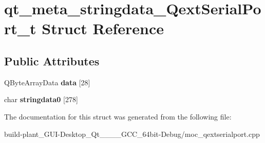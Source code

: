 \hypertarget{structqt__meta__stringdata__QextSerialPort__t}{}\section{qt\+\_\+meta\+\_\+stringdata\+\_\+\+Qext\+Serial\+Port\+\_\+t Struct Reference}
\label{structqt__meta__stringdata__QextSerialPort__t}
\subsection*{Public Attributes}
\begin{DoxyCompactItemize}
\item 
\mbox{\label{structqt__meta__stringdata__QextSerialPort__t_ad7c0c9f992a959feb84efc538943812f}} 
Q\+Byte\+Array\+Data {\bfseries data} \mbox{[}28\mbox{]}
\item 
\mbox{\label{structqt__meta__stringdata__QextSerialPort__t_a29544834fa5c30fb08d3a3eb981dc090}} 
char {\bfseries stringdata0} \mbox{[}278\mbox{]}
\end{DoxyCompactItemize}


The documentation for this struct was generated from the following file\+:\begin{DoxyCompactItemize}
\item 
build-\/plant\+\_\+\+G\+U\+I-\/\+Desktop\+\_\+\+Qt\+\_\+\_\+\_\+\_\+\+G\+C\+C\+\_\+64bit-\/\+Debug/moc\+\_\+qextserialport.\+cpp\end{DoxyCompactItemize}
